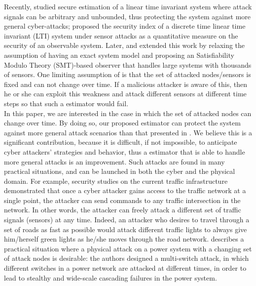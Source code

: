 \documentclass[twocolumn]{autart}    %
\newcommand{\rev}[1]{{\normalsize{{{\color{blue}#1}}}}}
\begin{document}
Recently, \cite{Fawzi2014} studied secure estimation of a linear time invariant system where attack signals can be arbitrary and unbounded, thus protecting the system against more general cyber-attacks; \rev{\cite{chong2016characterising} proposed the security index of a discrete time linear time invariant (LTI) system under sensor attacks as a quantitative measure on the security of an observable system.}
Later, \cite{Pajic2014} and \cite{shoukry2016smt} extended this work by relaxing the assumption of having an exact system model and proposing an \rev{Satisfiability Modulo Theory (SMT)}-based observer that handles large systems with thousands of sensors. One limiting assumption of \cite{Fawzi2014} \cite{Pajic2014} \cite{shoukry2016smt} is that the set of attacked nodes/sensors is fixed and can not change over time. If a malicious attacker is aware of this, then he or she can exploit this weakness and attack different sensors at different time steps so that such a \rev{estimator} would fail.\\
In this paper, we are interested in the case in which the set of attacked nodes can change over time. By doing so, our proposed \rev{estimator} can protect the system against more general attack scenarios than that presented in \cite{Fawzi2014}. We believe this is a significant contribution, because it is difficult, if not impossible, to anticipate cyber attackers' strategies and behavior, thus a \rev{estimator} that is able to handle more general attacks is an improvement. 
{Such attacks are found in many practical situations, and can be launched in both the cyber and the physical domain.}
For example, security studies on the current traffic infrastructure \cite{ghena2014traffic} demonstrated that once a cyber attacker gains access to the traffic network at a single point, the attacker can send commands to any traffic intersection in the network. In other words, the attacker can freely attack a different set of traffic signals (sensors) at any time. Indeed, an attacker who desires to travel through a set of roads as fast as possible would attack different traffic lights to always give him/herself green lights as he/she moves through the road network. 
{\cite{liu2014coordinated} describes a practical situation where a physical attack on a power system with a changing set of attack nodes is desirable: the authors designed a multi-switch attack, in which different switches in a power network are attacked at different times, in order to lead to stealthy and wide-scale cascading failures in the power system.}\\
\vspace{-0.8cm}
\end{document}
